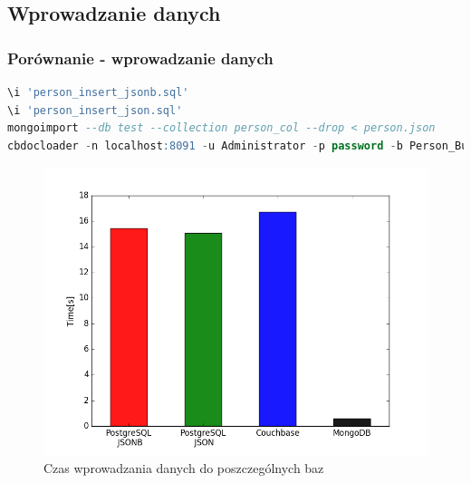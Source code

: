 \documentclass{beamer}
\begin{document}
\begin{frame}[fragile]
\subsection{Wprowadzanie danych}
\frametitle{Porównanie - wprowadzanie danych}
\begin{lstlisting}[language=SQL,basicstyle=\tiny]
\i 'person_insert_jsonb.sql'
\i 'person_insert_json.sql'
mongoimport --db test --collection person_col --drop < person.json
cbdocloader -n localhost:8091 -u Administrator -p password -b Person_Bucket Person_Bucket.zip
\end{lstlisting}
\begin{figure}[h]
\begin{center}
\includegraphics[scale=0.37]{ax/fig0}
\end{center}
\caption{Czas wprowadzania danych do poszczególnych baz}
\end{figure}

\end{frame}
\end{document}

